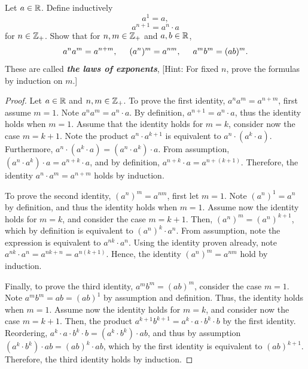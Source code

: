 \documentclass[12pt]{article}
\begin{document}
	 Let $a \in \mathbb{R}$. Define inductively
	$$
	a^1 = a,
	$$
	$$
	a^{n + 1} = a^n \cdot a
	$$
	for $n \in \mathbb{Z}_{+}$. Show that for $n,m \in \mathbb{Z}_{+}$ and $a, b \in \mathbb{R}$,
	$$
	a^n a^m = a^{n + m}, \hspace{5mm} (a^n)^m = a^{nm}, \hspace{5mm} a^mb^m = (ab)^m.
	$$
	These are called \textbf{\textit{the laws of exponents}}, [Hint: For fixed $n$, prove the formulas by induction
	on $m$.]
	\begin{proof}
		Let $a \in \mathbb{R}$ and $n, m \in \mathbb{Z}_{+}$. To prove the first identity, $a^n a^m = a^{n + m}$, first 
		assume $m = 1$. Note $a^n a^m = a^n \cdot a$. By definition, $a^{n + 1} = a^n \cdot a$, thus
		the identity holds when $m = 1$. Assume that the identity holds for $m = k$, consider now the 
		case $m = k + 1$. Note the product $a^n \cdot a^{k + 1}$ is equivalent to $a^n \cdot (a^k \cdot a)$.
		Furthermore, $a^n \cdot (a^k \cdot a) = (a^n \cdot a^k) \cdot a$. From assumption, 
		$(a^n \cdot a^k) \cdot a = a^{n + k} \cdot a$, and by definition, $a^{n + k} \cdot a = a^{n + (k + 1)}$.
		Therefore, the identity $a^n \cdot a^m = a^{n + m}$ holds by induction.
		
		To prove the second identity, $(a^n)^m = a^{nm}$, first let $m = 1$. Note $(a^n)^1 = a^n$ by definition,
		and thus the identity holds when $m = 1$. Assume now the identity holds for $m = k$, and consider
		the case $m = k + 1$. Then, $(a^n)^m = (a^n)^{k + 1}$, which by definition is equivalent to 
		$(a^n)^k \cdot a^n$. From assumption, note the expression is equivalent to $a^{nk} \cdot a^n$.
		Using the identity proven already, note $a^{nk} \cdot a^n = a^{nk + n} = a^{n(k + 1)}$.
		Hence, the identity $(a^n)^m = a^{nm}$ hold by induction.
		
		Finally, to prove the third identity, $a^mb^m = (ab)^m$, consider the case $m = 1$. Note
		$a^mb^m = ab = (ab)^1$ by assumption and definition. Thus, the identity holds when $m = 1$.
		Assume now the identity holds for $m = k$, and consider now the case $m = k + 1$.
		Then, the product $a^{k + 1}b^{k+1} = a^k \cdot a \cdot b^k \cdot b$ by the first identity.
		Reordering, $a^k \cdot a \cdot b^k \cdot b = (a^k \cdot b^k) \cdot ab$, and thus
		by assumption $(a^k \cdot b^k) \cdot ab = (ab)^k \cdot ab$, which by the first 
		identity is equivalent to $(ab)^{k + 1}$. Therefore, the third identity holds by induction.
	\end{proof}
	
\end{document}
